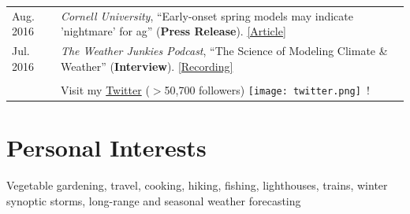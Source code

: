 \documentclass[margin,line,palatino,courier,10pt]{res}
\begin{document}
\begin{resume}
\begin{tabular}{@{}p{0.9in}p{4in}}
Aug. 2016 & \textit{Cornell University}, ``Early-onset spring models may indicate 'nightmare' for ag'' (\textbf{Press Release}). \href{http://www.news.cornell.edu/stories/2016/08/early-onset-spring-models-may-indicate-nightmare-ag}{[Article]}\\
Jul. 2016 & \textit{The Weather Junkies Podcast}, ``The Science of Modeling Climate \& Weather'' (\textbf{Interview}). \href{https://www.youtube.com/watch?v=vgT5P9zC91U}{[Recording]}\\\\

& Visit my \href{https://twitter.com/ZLabe}{Twitter} ($>$50,700 followers) \texttt{[image: twitter.png]}\ !\\
\end{tabular}

\vspace{-0.1in}
\noindent\textcolor{Cerulean}{\makebox[\linewidth][r]{\rule{\textwidth}{5pt}}}
\vspace{-0.3in}
\section{\sc \textcolor{Cerulean}{\large{\textbf{Personal Interests}}}}
Vegetable gardening, travel, cooking, hiking, fishing, lighthouses, trains, winter synoptic storms, long-range and seasonal weather forecasting

\end{resume}
\end{document}
